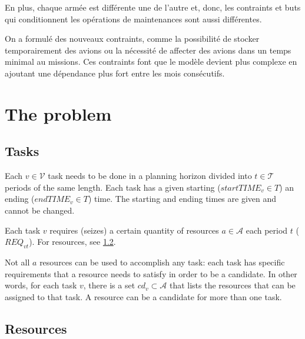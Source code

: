 \documentclass{roadef}
\begin{document}
    En plus, chaque armée est différente une de l'autre et, donc, les contraints et buts qui conditionnent les opérations de maintenances sont aussi différentes.

    On a formulé des nouveaux contraints, comme la possibilité de stocker temporairement des avions ou la nécessité de affecter des avions dans un temps minimal au missions. Ces contraints font que le modèle devient plus complexe en ajoutant une dépendance plus fort entre les mois consécutifs.

\section{The problem}


    \subsection{Tasks}
    \label{def:task}

    Each $v \in \mathcal{V}$ task needs to be done in a planning horizon divided into $t \in \mathcal{T}$ periods of the same length. Each task has a given starting ($startTIME_v \in T$) an ending ($endTIME_v \in T$) time. The starting and ending times are given and cannot be changed.

    Each task $v$ requires (seizes) a certain quantity of resources $a \in \mathcal{A}$ each period $t$ ($REQ_{vt}$). For resources, see \ref{def:resource}.

    Not all $a$ resources can be used to accomplish any task: each task has specific requirements that a resource needs to satisfy in order to be a candidate. In other words, for each task $v$, there is a set $cd_{v} \subset \mathcal{A}$ that lists the resources that can be assigned to that task. A resource can be a candidate for more than one task.


    \subsection{Resources}
    \label{def:resource}
\end{document}
